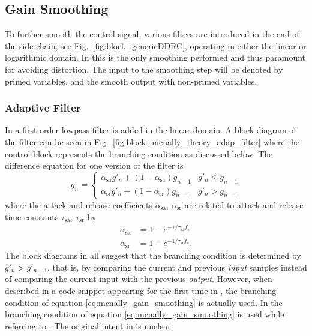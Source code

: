 \documentclass[../main2.tex]{subfiles}
\begin{document}
\FloatBarrier
\subsection{Gain Smoothing}
To further smooth the control signal, various filters are introduced in the end of the side-chain, see Fig.~\ref{fig:block_genericDDRC}, operating in either the linear or logarithmic domain. In \cite{reiss2012tutorial} this is the only smoothing performed and thus paramount for avoiding distortion. The input to the smoothing step will be denoted by primed variables, and the smooth output with non-primed variables.

\subsubsection{Adaptive Filter} \label{adaptive_filter}
In \cite{mcnally1984dynamic} a first order lowpass filter is added in the linear domain. A block diagram of the filter can be seen in Fig.~\ref{fig:block_mcnally_theory_adap_filter} where the control block represents the branching condition as discussed below. The difference equation for one version of the filter is
\begin{equation}\label{eq:mcnally_gain_smoothing}
g_n = \begin{cases}
    \alpha_\text{sa} g'_n + (1-\alpha_\text{sa}) g_{n-1}   & g'_n \leq g_{n-1} \\
    \alpha_\text{sr} g'_n + (1-\alpha_\text{sr}) g_{n-1}	   & g'_n > g_{n-1}
\end{cases}
\end{equation}
where the attack and release coefficients $\alpha_\text{sa}$, $\alpha_\text{sr}$ are related to attack and release time constants $\tau_\text{sa}$, $\tau_\text{sr}$ by 
\begin{align}
\alpha_\text{sa} &= 1 - e^{-1/\tau_\text{sa} f_s } \label{eq:attack_coeff_def}\\
\alpha_\text{sr} &= 1 - e^{-1/\tau_\text{sr} f_s } \label{eq:release_coeff_def}.
\end{align}
The block diagrams in \cite{mcnally1984dynamic, dafx02, dafx11, zolzer1997digital, zolzer2008digital} all suggest that the branching condition is determined by $g'_n > g'_{n-1}$, that is, by comparing the current and previous \emph{input} samples instead of comparing the current input with the previous \emph{output}. However, when described in a code snippet appearing for the first time in \cite{dafx11}, the branching condition of equation \eqref{eq:mcnally_gain_smoothing} is actually used. In \cite{bitzer2006parameter} the branching condition of equation \eqref{eq:mcnally_gain_smoothing} is used while referring to \cite{mcnally1984dynamic, dafx02}. The original intent in \cite{mcnally1984dynamic} is unclear.
\end{document}
